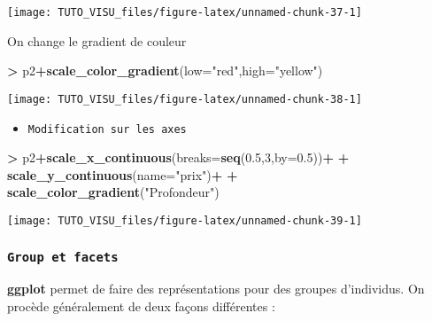 \documentclass[]{article}
\newenvironment{Shaded}{\begin{snugshade}}{\end{snugshade}}
\newcommand{\DataTypeTok}[1]{\textcolor[rgb]{0.13,0.29,0.53}{#1}}
\newcommand{\DecValTok}[1]{\textcolor[rgb]{0.00,0.00,0.81}{#1}}
\newcommand{\FloatTok}[1]{\textcolor[rgb]{0.00,0.00,0.81}{#1}}
\newcommand{\KeywordTok}[1]{\textcolor[rgb]{0.13,0.29,0.53}{\textbf{#1}}}
\newcommand{\NormalTok}[1]{#1}
\newcommand{\OperatorTok}[1]{\textcolor[rgb]{0.81,0.36,0.00}{\textbf{#1}}}
\newcommand{\StringTok}[1]{\textcolor[rgb]{0.31,0.60,0.02}{#1}}
\providecommand{\tightlist}{%
  \setlength{\itemsep}{0pt}\setlength{\parskip}{0pt}}
\theoremstyle{definition}
\theoremstyle{definition}
\theoremstyle{definition}
\theoremstyle{remark}
\begin{document}
\begin{center}\texttt{[image: TUTO\_VISU\_files/figure-latex/unnamed-chunk-37-1]} \end{center}

On change le gradient de couleur

\begin{Shaded}
\begin{Highlighting}[]
\OperatorTok{>}\StringTok{ }\NormalTok{p2}\OperatorTok{+}\KeywordTok{scale_color_gradient}\NormalTok{(}\DataTypeTok{low=}\StringTok{"red"}\NormalTok{,}\DataTypeTok{high=}\StringTok{"yellow"}\NormalTok{)}
\end{Highlighting}
\end{Shaded}

\begin{center}\texttt{[image: TUTO\_VISU\_files/figure-latex/unnamed-chunk-38-1]} \end{center}

\begin{itemize}
\tightlist
\item
  \texttt{Modification\ sur\ les\ axes}
\end{itemize}

\begin{Shaded}
\begin{Highlighting}[]
\OperatorTok{>}\StringTok{ }\NormalTok{p2}\OperatorTok{+}\KeywordTok{scale_x_continuous}\NormalTok{(}\DataTypeTok{breaks=}\KeywordTok{seq}\NormalTok{(}\FloatTok{0.5}\NormalTok{,}\DecValTok{3}\NormalTok{,}\DataTypeTok{by=}\FloatTok{0.5}\NormalTok{))}\OperatorTok{+}
\OperatorTok{+}\StringTok{   }\KeywordTok{scale_y_continuous}\NormalTok{(}\DataTypeTok{name=}\StringTok{"prix"}\NormalTok{)}\OperatorTok{+}
\OperatorTok{+}\StringTok{   }\KeywordTok{scale_color_gradient}\NormalTok{(}\StringTok{"Profondeur"}\NormalTok{)}
\end{Highlighting}
\end{Shaded}

\begin{center}\texttt{[image: TUTO\_VISU\_files/figure-latex/unnamed-chunk-39-1]} \end{center}

\hypertarget{group-et-facets}{%
\subsubsection{\texorpdfstring{\texttt{Group\ et\ facets}}{Group et facets}}\label{group-et-facets}}

\textbf{ggplot} permet de faire des représentations pour des groupes d'individus. On procède généralement de deux façons différentes :
\end{document}
